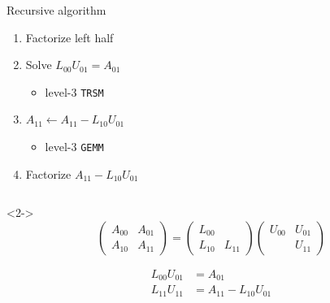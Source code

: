 \documentclass[xcolor={rgb,x11names,svgnames},rgb,x11names,svgnames]{beamer}
\begin{document}
\begin{frame}[label=lu]
\begin{columns}
\begin{column}{5.5cm}
 \begin{block}{Recursive algorithm}
   \begin{enumerate}
   \item<3-> Factorize left half
   \item<5-> Solve $L_{00} U_{01} = A_{01}$
     \begin{itemize}
     \item level-3 \texttt{TRSM}
     \end{itemize}
     
   \item<7-> $A_{11} \gets A_{11} - L_{10} U_{01}$
     \begin{itemize}
     \item level-3 \texttt{GEMM}
     \end{itemize}
   \item<9-> Factorize $A_{11} - L_{10} U_{01}$
     
   \end{enumerate}
 \end{block}

\end{column}
\end{columns}

\medskip

\begin{visibleenv}<2->
\[
  \begin{pmatrix}
       A_{00} & A_{01} \\
       A_{10} & A_{11} 
     \end{pmatrix}
     =
     \begin{pmatrix}
       L_{00} &  \\
       L_{10} & L_{11} 
     \end{pmatrix}
     \begin{pmatrix}
       U_{00} & U_{01} \\
       & U_{11} 
     \end{pmatrix}
   \]

   \vspace{-0.5cm}
   
   \begin{align*}     
     L_{00} U_{01} &= A_{01} \\
     L_{11} U_{11} &= A_{11} - L_{10} U_{01}
   \end{align*}
 \end{visibleenv}
\end{frame}


\end{document}

